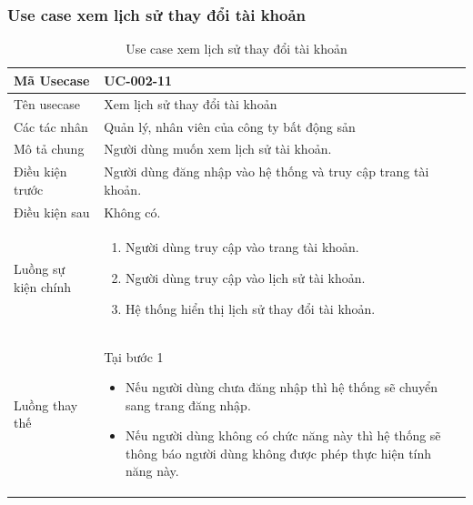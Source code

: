 \documentclass[12pt,a4paper]{article}
\begin{document}
    \subsubsection*{Use case xem lịch sử thay đổi tài khoản}
    \begin{table}[H]
        \centering
        \begin{tabular}{|p{3.5cm}|p{11.5cm}|c|}
            \hline
            Mã Usecase      & UC-002-11                                                      \\
            \hline
            Tên usecase     & Xem lịch sử thay đổi tài khoản                                 \\
            \hline
            Các tác nhân    & Quản lý, nhân viên của công ty bất động sản                    \\
            \hline
            Mô tả chung     & Người dùng muốn xem lịch sử tài khoản.                         \\
            \hline
            Điều kiện trước & Người dùng đăng nhập vào hệ thống và truy cập trang tài khoản. \\
            \hline
            Điều kiện sau   & Không có.                                                      \\
            \hline
            Luồng sự kiện chính & \vspace{-.8cm}\begin{enumerate}
                                                    \item Người dùng truy cập vào trang tài khoản.
                                                    \item Người dùng truy cập vào lịch sử tài khoản.
                                                    \item Hệ thống hiển thị lịch sử thay đổi tài khoản.
            \end{enumerate}
            \\
            \hline
            Luồng thay thế & Tại bước 1\newline
            \vspace{-.8cm}\begin{itemize}
                              \item Nếu người dùng chưa đăng nhập thì hệ thống sẽ chuyển sang trang đăng nhập.
                              \item Nếu người dùng không có chức năng này thì hệ thống sẽ thông báo người dùng không được phép thực hiện tính năng này.
            \end{itemize}
            \\ \hline
        \end{tabular}
        \caption{Use case xem lịch sử thay đổi tài khoản}
    \end{table}
\end{document}

